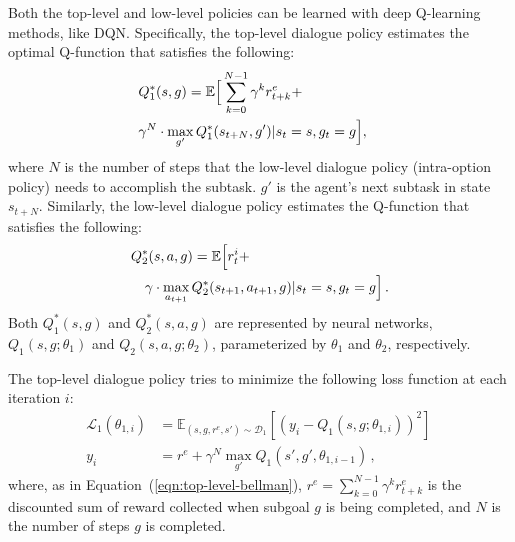 \documentclass[11pt,letterpaper]{article}
\begin{document}
Both the top-level and low-level policies can be learned with deep Q-learning methods, like DQN. Specifically, the top-level dialogue policy estimates the optimal Q-function that satisfies the following:
\begin{eqnarray}
\lefteqn{Q_{1}^*(s,g) = \mathbb{E} \Big[ \sum_{k=0}^{N-1} \gamma^k r^e_{t+k} +} \nonumber \\
&\gamma^N \cdot \max_{g'} Q_{1}^*(s_{t+N},g')|s_t=s, g_t=g\Big], \label{eqn:top-level-bellman}
\end{eqnarray}
where $N$ is the number of steps that the low-level dialogue policy (intra-option policy) needs to accomplish the subtask. $g'$ is the agent's next subtask in state $s_{t+N}$. Similarly, the low-level dialogue policy estimates the Q-function that satisfies the following:
\begin{eqnarray*}
\lefteqn{Q_{2}^*(s,a, g) = \mathbb{E} \Big[ r^i_t +} \\
&&\gamma \cdot \max_{a_{t+1}} Q_{2}^*(s_{t+1},a_{t+1}, g)|s_t=s, g_t=g\Big]\,.
\end{eqnarray*}
Both $Q_1^*(s, g)$ and $Q_2^*(s, a, g)$ are represented by neural networks, $Q_1(s, g; \theta_1)$ and $Q_2(s, a, g;\theta_2)$, parameterized by $\theta_1$ and $\theta_2$, respectively.

The top-level dialogue policy tries to minimize the following loss function at each iteration $i$:
\begin{align*}
\mathcal{L}_1(\theta_{1,i}) &= \mathbb{E}_{(s,g,r^e,s')\sim \mathcal{D}_1}[(y_i - Q_1(s,g;\theta_{1,i}))^2]\, \\
y_i &= r^e +\gamma^N \max_{g'}Q_1(s',g',\theta_{1,i-1})\,,
\end{align*}
where, as in Equation~(\ref{eqn:top-level-bellman}), $r^e=\sum_{k=0}^{N-1} \gamma^k r^e_{t+k}$ is the discounted sum of reward collected when subgoal $g$ is being completed, and $N$ is the number of steps $g$ is completed.
\end{document}
